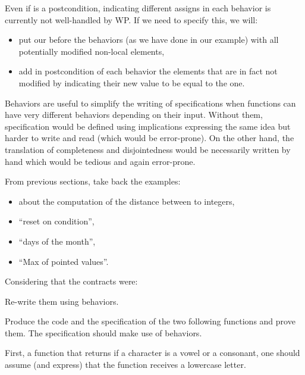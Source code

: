 \begin{Warning}
  Even if  is a postcondition, indicating different assigns
  in each behavior is currently not well-handled by WP. If we need to specify
  this, we will:
  \begin{itemize}
  \item put our  before the behaviors (as we have done in our
    example) with all potentially modified non-local elements,
  \item add in postcondition of each behavior the elements that are in fact
    not modified by indicating their new value to be equal to the
     one.
  \end{itemize}
\end{Warning}


Behaviors are useful to simplify the writing of specifications when
functions can have very different behaviors depending on their input.
Without them, specification would be defined using implications
expressing the same idea but harder to write and read (which would be
error-prone). On the other hand, the translation of completeness and
disjointedness would be necessarily written by hand which would be
tedious and again error-prone.






From previous sections, take back the examples:
\begin{itemize}
\item about the computation of the distance between to integers,
\item ``reset on condition'',
\item ``days of the month'',
\item ``Max of pointed values''.
\end{itemize}


Considering that the contracts were:




Re-write them using behaviors.




Produce the code and the specification of the two following functions
and prove them. The specification should make use of behaviors.


First, a function that returns if a character is a vowel or a consonant,
one should assume (and express) that the function receives a lowercase
letter.


